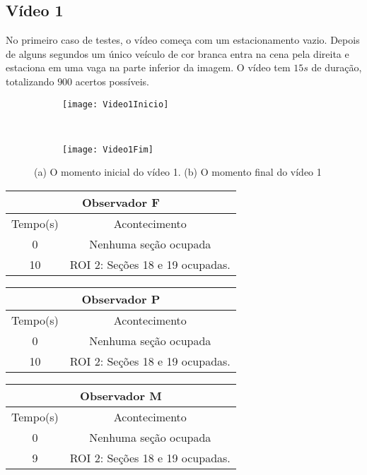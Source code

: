  
\subsection{Vídeo 1}

No primeiro caso de testes, o vídeo começa com um estacionamento vazio. Depois de alguns segundos um único veículo de cor branca entra na cena pela direita e estaciona em uma vaga na parte inferior da imagem. O vídeo tem $15s$ de duração, totalizando $900$ acertos possíveis.

\begin{figure}[!h]
\centering
\begin{subfigure}{.5\textwidth}
\centering
\texttt{[image: Video1Inicio]}
\caption{}
\end{subfigure}\
\begin{subfigure}{.5\textwidth}
\centering
\texttt{[image: Video1Fim]}
\caption{}
\end{subfigure}
\centering
\caption{(a) O momento inicial do vídeo 1. (b) O momento final do vídeo 1}%
\label{}%
\end{figure}


\begin{center}
\begin{tabular}{|c||c|}
\hline
\multicolumn{2}{|c|}{Observador F}  \\ \hline \hline
Tempo(s) & Acontecimento \\ \hline
0 & Nenhuma seção ocupada \\ \hline
10 & ROI 2: Seções 18 e 19 ocupadas. \\
\hline
\end{tabular}
\end{center}

\begin{center}
\begin{tabular}{|c||c|}
\hline
\multicolumn{2}{|c|}{Observador P}  \\ \hline \hline
Tempo(s) & Acontecimento \\ \hline
0 & Nenhuma seção ocupada \\ \hline
10 & ROI 2: Seções 18 e 19 ocupadas. \\
\hline
\end{tabular}
\end{center}

\begin{center}
\begin{tabular}{|c||c|}
\hline
\multicolumn{2}{|c|}{Observador M}  \\ \hline \hline
Tempo(s) & Acontecimento \\ \hline
0 & Nenhuma seção ocupada \\ \hline
9 & ROI 2: Seções 18 e 19 ocupadas. \\
\hline
\end{tabular}
\end{center}

